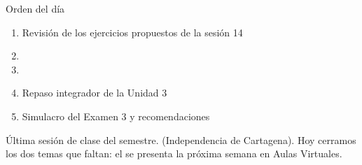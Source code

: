 \documentclass[aspectratio=169,10pt]{beamer}
\begin{document}
\portada

\begin{frame}{Orden del día}
  \begin{enumerate}
    \item Revisión de los ejercicios propuestos de la sesión 14
    \item {}
    \item {}
    \item Repaso integrador de la Unidad 3
    \item Simulacro del Examen 3 y recomendaciones
  \end{enumerate}

  \vspace{0.25cm}
  {\footnotesize\color{uniGris} Última sesión de clase del semestre.
   (Independencia de Cartagena). Hoy cerramos
  los dos temas que faltan: el  se presenta la
  próxima semana en Aulas Virtuales.}
\end{frame}

\end{document}
